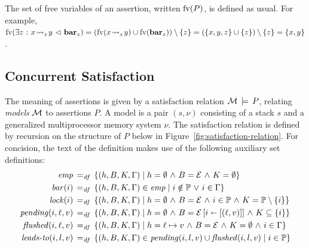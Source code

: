 \documentclass[11pt]{report}         %
\begin{document}
The set of free variables of an assertion, written $\fv{P}$, is defined as usual. For example, $\fv{\exists z \st x \fwrite{z} y \fseq \fbar{z}} = (\fv{x \fwrite{z} y} \cup \fv{\fbar{z}}) \setminus \set{z} = (\set{x,y,z} \cup \set{z}) \setminus \set{z} = \set{x,y}$. 

\subsection{Concurrent Satisfaction}

The meaning of assertions is given by a satisfaction relation $\amod \sentails P$, relating \emph{models} $\amod$ to assertions $P$. A model is a pair $(s,\nu)$ consisting of a stack $s$ and a generalized multiprocessor memory system $\nu$. 
The satisfaction relation is defined by recursion on the structure of $P$ below in Figure~\ref{fig:satisfaction-relation}. For concision, the text of the definition makes use of the following auxiliary set definitions: \begin{align*}
  \mathit{emp} \eqdef & \setof{(h,B,K,\Gamma)}{h = \nil \conj B = \arnil \conj K = \nil} \\ 
  \mathit{bar}(i) \eqdef & \setof{(h,B,K,\Gamma) \in \mathit{emp}}{i \notin \setprocessors \disj i \in \Gamma} \\ 
  \mathit{lock}(i) \eqdef & \setof{(h,B,K,\Gamma)}{h = \nil \conj B = \arnil \conj i \in \setprocessors \conj K = \setprocessors \setminus \set{i}} \\ 
  \mathit{pending}(i,\ell,v) \eqdef & \setof{(h,B,K,\Gamma)}{h = \nil \conj B = \funup{\arnil}{\ptup{i}{\llit{(\ell,v)}}} \conj K \subseteq \set{i}} \\
  \mathit{flushed}(i,\ell,v) \eqdef & \setof{(h,B,K,\Gamma)}{h = \ell \mapsto v \conj B = \arnil \conj K = \nil \conj i \in \Gamma} \\
  \text{\textit{leads-to}}(i,l,v) \eqdef & \setof{(h,B,K,\Gamma) \in \mathit{pending}(i,l,v) \cup \mathit{flushed}(i,l,v)}{i \in \setprocessors}
\end{align*}
\end{document}
